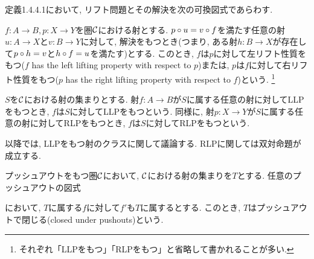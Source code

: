 \documentclass[uplatex, a4paper, 14Q, dvipdfmx]{jsreport}
\begin{document}
\begin{remark}
  定義1.4.4.1において, リフト問題とその解決を次の可換図式であらわす. 
  \begin{center}
  \end{center}
\end{remark}

\begin{definition}
  $f: A \to B, p: X \to Y$を圏$\mathcal{C}$における射とする. 
  $p \circ u = v \circ f$を満たす任意の射$u: A \to X$と$v: B \to Y$に対して, 解決をもつとき(つまり, ある射$h: B \to X$が存在して$p \circ h=v$と$h \circ f=u$を満たす)とする. 
  このとき, $f$は$p$に対して左リフト性質をもつ($f$ has the left lifting property with respect to $p$)または, $p$は$f$に対して右リフト性質をもつ($p$ has the right lifting property with respect to $f$)という. 
  \footnote{
    それぞれ「LLPをもつ」「RLPをもつ」と省略して書かれることが多い. 
  }
  \begin{center}
  \end{center}
\end{definition}

$S$を$\mathcal{C}$における射の集まりとする. 
射$f: A \to B$が$S$に属する任意の射に対してLLPをもつとき, $f$は$S$に対してLLPをもつという. 
同様に, 射$p: X \to Y$が$S$に属する任意の射に対してRLPをもつとき, $f$は$S$に対してRLPをもつという. 

以降では, LLPをもつ射のクラスに関して議論する. 
RLPに関しては双対命題が成立する. 

\begin{definition}
  プッシュアウトをもつ圏$\mathcal{C}$において, $\mathcal{C}$における射の集まりを$T$とする. 
  任意のプッシュアウトの図式
  \begin{center}
  \end{center}
  において, $T$に属する$f$に対して$f'$も$T$に属するとする.
  このとき, $T$はプッシュアウトで閉じる(closed under pushouts)という. 
\end{definition}
\end{document}

